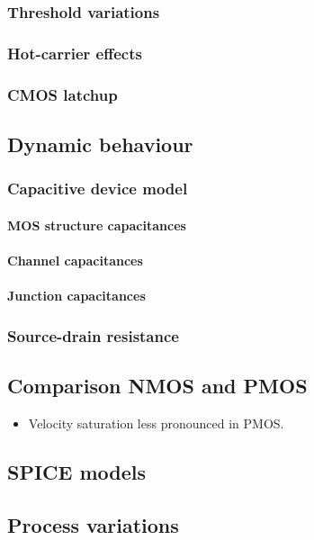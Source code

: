 \documentclass{report}
\begin{document}
\subsubsection{Threshold variations}
\subsubsection{Hot-carrier effects}
\subsubsection{CMOS latchup}
\subsection{Dynamic behaviour}
\subsubsection{Capacitive device model}
\paragraph{MOS structure capacitances}
\paragraph{Channel capacitances}
\paragraph{Junction capacitances}
\subsubsection{Source-drain resistance}

\subsection{Comparison NMOS and PMOS}
\begin{itemize}
\item Velocity saturation less pronounced in PMOS.
\end{itemize}

\subsection{SPICE models}

\subsection{Process variations}
\end{document}
